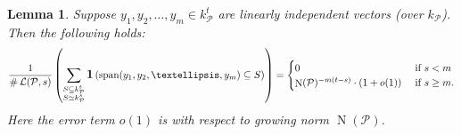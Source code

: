 \documentclass{amsart}
\newtheorem{lemma}[theorem]{Lemma}
\DeclareMathOperator{\card}{\texttt{\#}}
\DeclareMathOperator{\spant}{span}
\DeclareMathOperator{\ind}{\mathlarger{\mathbf{1}}}
\DeclareMathOperator{\N}{N}
\DeclareMathOperator{\Gr}{\mathbf{Gr}}
\begin{document}
\begin{lemma}
\label{le:counting}
Suppose $y_1, y_2,\dots,y_m \in k_{\mathcal{P}}^{t}$ are linearly independent vectors (over $k_{\mathcal{P}}$). Then the following holds:
{\small\begin{equation}
\frac{  1}{\card \mathcal{L}(\mathcal{P},s)} 
\left(
\sum_{\substack{  S \subseteq k_\mathcal{P}^{t} \\  S \simeq k_{\mathcal{P}}^{s} } } 
\ind\left(
\spant
( y_1,y_2,\dots,y_m) \subseteq S
\right) \right) = \begin{cases}
0 &  \text{ if $s<m$}\\
\N(\mathcal{P})^{-m(t-s)}\cdot (1+o(1)) &  \text{ if $s \geq m$.}
\end{cases}
\end{equation}}
Here the error term $o(1)$ is with respect to growing norm $\N(\mathcal{P})$.
\end{lemma}

\end{document}
